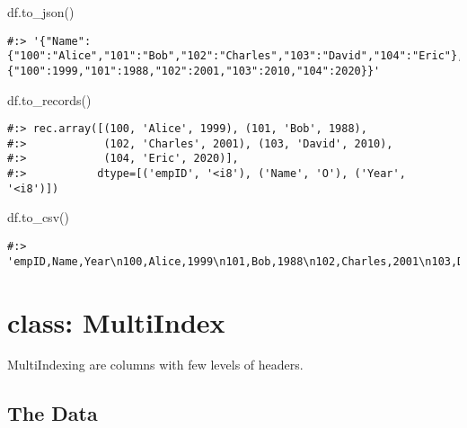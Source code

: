 \documentclass[
]{book}
\newenvironment{Shaded}{\begin{snugshade}}{\end{snugshade}}
\newcommand{\NormalTok}[1]{#1}
\begin{document}
\begin{Shaded}
\begin{Highlighting}[]
\NormalTok{df.to\_json()}
\end{Highlighting}
\end{Shaded}

\begin{verbatim}
#:> '{"Name":{"100":"Alice","101":"Bob","102":"Charles","103":"David","104":"Eric"},"Year":{"100":1999,"101":1988,"102":2001,"103":2010,"104":2020}}'
\end{verbatim}

\begin{Shaded}
\begin{Highlighting}[]
\NormalTok{df.to\_records()}
\end{Highlighting}
\end{Shaded}

\begin{verbatim}
#:> rec.array([(100, 'Alice', 1999), (101, 'Bob', 1988),
#:>            (102, 'Charles', 2001), (103, 'David', 2010),
#:>            (104, 'Eric', 2020)],
#:>           dtype=[('empID', '<i8'), ('Name', 'O'), ('Year', '<i8')])
\end{verbatim}

\begin{Shaded}
\begin{Highlighting}[]
\NormalTok{df.to\_csv()}
\end{Highlighting}
\end{Shaded}

\begin{verbatim}
#:> 'empID,Name,Year\n100,Alice,1999\n101,Bob,1988\n102,Charles,2001\n103,David,2010\n104,Eric,2020\n'
\end{verbatim}

\hypertarget{class-multiindex}{%
\section{class: MultiIndex}\label{class-multiindex}}

MultiIndexing are columns with few levels of headers.

\hypertarget{the-data-2}{%
\subsection{The Data}\label{the-data-2}}
\end{document}
